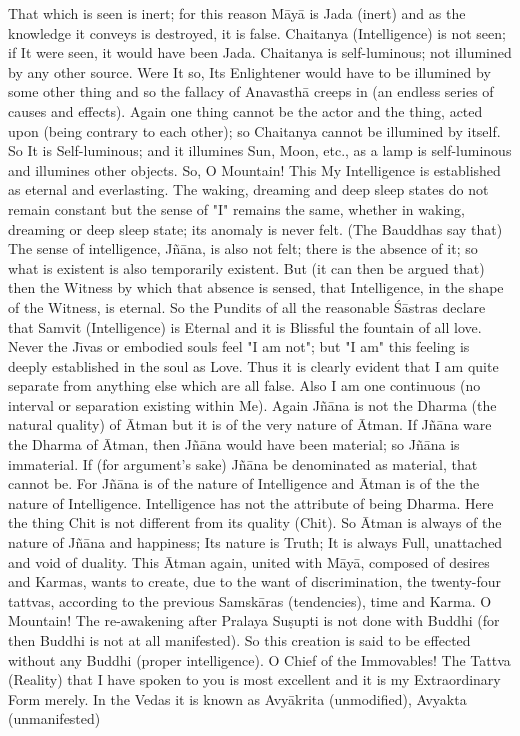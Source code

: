 That which is seen is inert; for this reason M\=ay\=a is Jada (inert) and as the knowledge it conveys is destroyed, it is false. Chaitanya (Intelligence) is not seen; if It were seen, it would have been Jada. Chaitanya is self-luminous; not illumined by any other source. Were It so, Its Enlightener would have to be illumined by some other thing and so the fallacy of Anavasth\=a creeps in (an endless series of causes and effects). Again one thing cannot be the actor and the thing, acted upon (being contrary to each other); so Chaitanya cannot be illumined by itself. So It is Self-luminous; and it illumines Sun, Moon, etc., as a lamp is self-luminous and illumines other objects. So, O Mountain! This My Intelligence is established as eternal and everlasting. The waking, dreaming and deep sleep states do not remain constant but the sense of "I" remains the same, whether in waking, dreaming or deep sleep state; its anomaly is never felt. (The Bauddhas say that) The sense of intelligence, J\~n\=ana, is also not felt; there is the absence of it; so what is existent is also temporarily existent. But (it can then be argued that) then the Witness by which that absence is sensed, that Intelligence, in the shape of the Witness, is eternal. So the Pundits of all the reasonable \'S\=astras declare that Samvit (Intelligence) is Eternal and it is Blissful the fountain of all love. Never the J\={\i}vas or embodied souls feel "I am not"; but "I am" this feeling is deeply established in the soul as Love. Thus it is clearly evident that I am quite separate from anything else which are all false. Also I am one continuous (no interval or separation existing within Me). Again J\~n\=ana is not the Dharma (the natural quality) of \=Atman but it is of the very nature of \=Atman. If J\~n\=ana ware the Dharma of \=Atman, then J\~n\=ana would have been material; so J\~n\=ana is immaterial. If (for argument's sake) J\~n\=ana be denominated as material, that cannot be. For J\~n\=ana is of the nature of Intelligence and \=Atman is of the the nature of Intelligence. Intelligence has not the attribute of being Dharma. Here the thing Chit is not different from its quality (Chit). So \=Atman is always of the nature of J\~n\=ana and happiness; Its nature is Truth; It is always Full, unattached and void of duality. This \=Atman again, united with M\=ay\=a, composed of desires and Karmas, wants to create, due to the want of discrimination, the twenty-four tattvas, according to the previous Samsk\=aras (tendencies), time and Karma. O Mountain! The re-awakening after Pralaya Su\d{s}upti is not done with Buddhi (for then Buddhi is not at all manifested). So this creation is said to be effected without any Buddhi (proper intelligence). O Chief of the Immovables! The Tattva (Reality) that I have spoken to you is most excellent and it is my Extraordinary Form merely. In the Vedas it is known as Avy\=akrita (unmodified), Avyakta (unmanifested)

